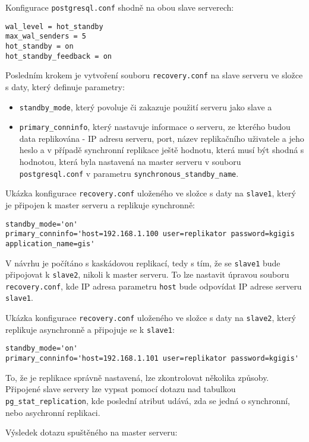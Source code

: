 Konfigurace \texttt{postgresql.conf} shodně na obou slave serverech:
\begin{lstlisting}
wal_level = hot_standby
max_wal_senders = 5
hot_standby = on
hot_standby_feedback = on
\end{lstlisting}

Posledním krokem je vytvoření souboru \texttt{recovery.conf} na slave serveru ve
složce s daty, který definuje parametry:
\begin{itemize}
  \item \texttt{standby\_mode}, který povoluje či zakazuje použití serveru jako
    slave a
  \item \texttt{primary\_conninfo}, který nastavuje informace o serveru, ze
    kterého budou data replikována - IP adresu serveru, port, název replikačního
    uživatele a jeho heslo a v případě synchronní replikace ještě hodnotu,
    která musí být shodná s hodnotou, která byla nastavená na master serveru v
    souboru \texttt{postgresql.conf} v parametru
    \texttt{synchronous\_standby\_name}.
\end{itemize}

Ukázka konfigurace \texttt{recovery.conf} uloženého ve složce s daty na
\texttt{slave1}, který je připojen k master serveru a replikuje synchronně:
\begin{lstlisting}
standby_mode='on'
primary_conninfo='host=192.168.1.100 user=replikator password=kgigis application_name=gis'
\end{lstlisting}

V návrhu je počítáno s kaskádovou replikací, tedy s tím, že se \texttt{slave1}
bude připojovat k \texttt{slave2}, nikoli k master serveru. To lze nastavit
úpravou souboru \texttt{recovery.conf}, kde IP adresa parametru \texttt{host}
bude odpovídat IP adrese serveru \texttt{slave1}.

Ukázka konfigurace \texttt{recovery.conf} uloženého ve složce s daty na
\texttt{slave2}, který replikuje asynchronně a připojuje se k
\texttt{slave1}:
\begin{lstlisting}
standby_mode='on'
primary_conninfo='host=192.168.1.101 user=replikator password=kgigis'
\end{lstlisting}

To, že je replikace správně nastavená, lze zkontrolovat několika způsoby.
Připojené slave servery lze vypsat pomocí dotazu nad tabulkou
\texttt{pg\_stat\_replication}, kde poslední atribut udává, zda se jedná o
synchronní, nebo asychronní replikaci.

Výsledek dotazu spuštěného na master serveru:

